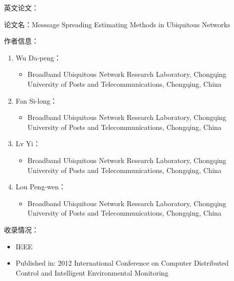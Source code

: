 英文论文：
    \item 论文名：Messsage Spreading Estimating Methods in Ubiquitous Networks
    \item 作者信息：
        \begin{enumerate}
            \begin{enumerate}
                \item Wu Da-peng：
                    \begin{itemize}
                        \item Broadband Ubiquitous Network Research Laboratory, Chongqing University of Posts and Telecommunications, Chongqing, China
                    \end{itemize}
                \item Fan Si-long：
                    \begin{itemize}
                        \item Broadband Ubiquitous Network Research Laboratory, Chongqing University of Posts and Telecommunications, Chongqing, China
                    \end{itemize}
                \item Lv Yi：
                    \begin{itemize}
                        \item Broadband Ubiquitous Network Research Laboratory, Chongqing University of Posts and Telecommunications, Chongqing, China
                    \end{itemize}
                \item Lou Peng-wen：
                    \begin{itemize}
                        \item Broadband Ubiquitous Network Research Laboratory, Chongqing University of Posts and Telecommunications, Chongqing, China
                    \end{itemize}
            \end{enumerate}
        \end{enumerate}

    \item 收录情况：
        \begin{itemize}
            \item IEEE
            \item Published in: 2012 International Conference on Computer Distributed Control and Intelligent Environmental Monitoring
        \end{itemize}

